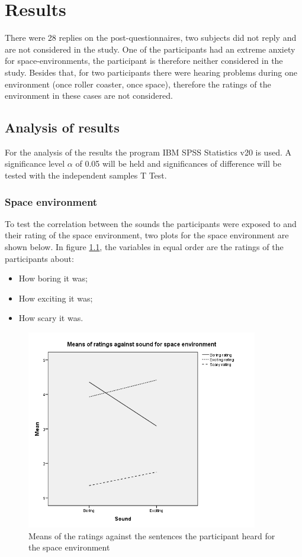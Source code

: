 \documentclass[Results.tex]{subfiles}
\begin{document}
\chapter{Results}

There were 28 replies on the post-questionnaires, two subjects did not reply and are not considered in the study. One of the participants had an extreme anxiety for space-environments, the participant is therefore neither considered in the study. Besides that, for two participants there were hearing problems during one environment (once roller coaster, once space), therefore the ratings of the environment in these cases are not considered.  

\section{Analysis of results}
For the analysis of the results the program IBM SPSS Statistics v20 is used. A significance level $\alpha$ of 0.05 will be held and significances of difference will be tested with the independent samples T Test.

\subsection{Space environment}
To test the correlation between the sounds the participants were exposed to and their rating of the space environment, two plots for the space environment are shown below. In figure \ref{fig:Ratings_sound_BM}, the variables in equal order are the ratings of the participants about: 
\begin{itemize}
	\item How boring it was;
	\item How exciting it was;
	\item How scary it was.
\end{itemize}

\begin{figure}[H]
	\centering
		\includegraphics[width=0.90\textwidth]{Section_1/Figures/Ratings_sound_BM.png}
	\caption{Means of the ratings against the sentences the participant heard for the space environment}
	\label{fig:Ratings_sound_BM}
\end{figure}
\end{document}
